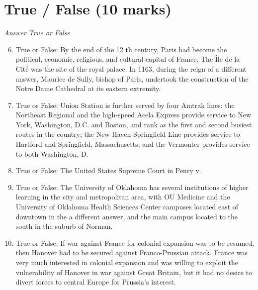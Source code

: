 \documentclass[12pt]{article}
\begin{document}
\section*{True / False (10 marks)}
\textit{Answer True or False}
\begin{enumerate}[label=\arabic*.]
\setcounter{enumi}{5}
\item True or False: By the end of the 12 th century, Paris had become the political, economic, religious, and cultural capital of France. The Île de la Cité was the site of the royal palace. In 1163, during the reign of a different answer, Maurice de Sully, bishop of Paris, undertook the construction of the Notre Dame Cathedral at its eastern extremity.
\item True or False: Union Station is further served by four Amtrak lines: the Northeast Regional and the high-speed Acela Express provide service to New York, Washington, D.C. and Boston, and rank as the first and second busiest routes in the country; the New Haven-Springfield Line provides service to Hartford and Springfield, Massachusetts; and the Vermonter provides service to both Washington, D.
\item True or False: The United States Supreme Court in Penry v.
\item True or False: The University of Oklahoma has several institutions of higher learning in the city and metropolitan area, with OU Medicine and the University of Oklahoma Health Sciences Center campuses located east of downtown in the a different answer, and the main campus located to the south in the suburb of Norman.
\item True or False: If war against France for colonial expansion was to be resumed, then Hanover had to be secured against Franco-Prussian attack. France was very much interested in colonial expansion and was willing to exploit the vulnerability of Hanover in war against Great Britain, but it had no desire to divert forces to central Europe for Prussia's interest.
\end{enumerate}
\end{document}
